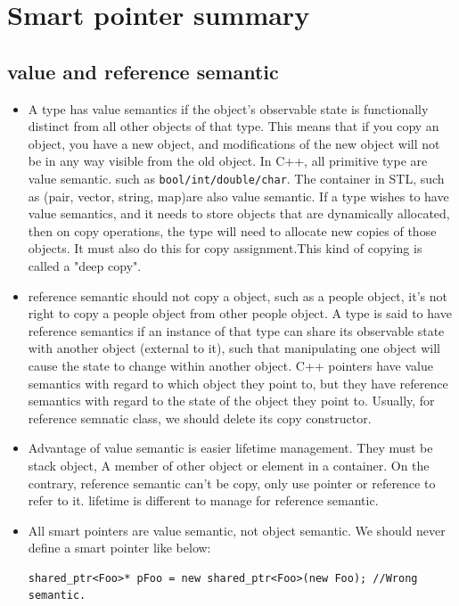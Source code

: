 \documentclass[a4paper,11pt,twoside]{book}
\begin{document}
\section{Smart pointer summary}

\subsection{value and reference semantic}
\begin{itemize}
	\item A type has value semantics if the object's observable state is functionally distinct from all other objects of that type. This means that if you copy an object, you have a new object, and modifications of the new object will not be in any way visible from the old object. In C++, all primitive type are value semantic. such as \texttt{bool/int/double/char}. The container in STL, such as (pair, vector, string, map)are also value semantic. If a type wishes to have value semantics, and it needs to store objects that are dynamically allocated, then on copy operations, the type will need to allocate new copies of those objects. It must also do this for copy assignment.This kind of copying is called a "deep copy".
	
	\item reference semantic should not copy a object, such as a people object, it's not right to copy a people object from other people object. A type is said to have reference semantics if an instance of that type can share its observable state with another object (external to it), such that manipulating one object will cause the state to change within another object. C++ pointers have value semantics with regard to which object they point to, but they have reference semantics with regard to the state of the object they point to. Usually, for reference semnatic class, we should delete its copy constructor. 
	
	\item Advantage of value semantic is easier lifetime management. They must be stack object, A member of other object or element in a container. On the contrary, reference semantic can't be copy, only use pointer or reference to refer to it. lifetime is different to manage for reference semantic. 
	
	\item All smart pointers are value semantic, not object semantic. We should never define a smart pointer like below:
	\begin{lstlisting}[numbers=none]
		shared_ptr<Foo>* pFoo = new shared_ptr<Foo>(new Foo); //Wrong semantic.
	\end{lstlisting}


\end{itemize}
\end{document}
